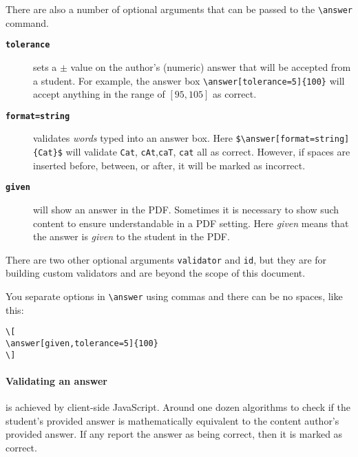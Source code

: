 \documentclass{ximera}
\begin{document}
There are also a number of optional arguments that can be passed
to the \verb|\answer| command.
\begin{description}
  \item[\tt\bfseries tolerance] sets a $\pm$ value on the
    author's (numeric) answer that will be accepted from a student. For
    example,
    the answer box \verb|\answer[tolerance=5]{100}| will accept anything in
    the range of $[95,105]$ as correct.
  \item[\tt\bfseries format=string] validates \textit{words} typed into an
    answer box. Here \verb|$\answer[format=string]{Cat}$| will validate
    \verb!Cat!,
    \verb!cAt!,\verb!caT!, \verb!cat! all as
    correct. However, if spaces are inserted before, between, or after, it will
    be marked as incorrect.
  \item[\tt\bfseries given] will show an answer in the PDF. Sometimes it is
    necessary to
    show such content to ensure
    understandable in a PDF setting. Here \textit{given} means
    that the answer is \textit{given} to the student in the PDF.
\end{description}
There are two other optional arguments \verb!validator! and \verb!id!, but they
are for building custom validators and are beyond the scope of this document.

\begin{warning}
  You separate options in \verb!\answer! using commas and there can be no
  spaces, like this:
  \begin{verbatim}
\[
\answer[given,tolerance=5]{100}
\]
\end{verbatim}
\end{warning}

\paragraph{Validating an answer} is achieved by client-side JavaScript. Around
one dozen algorithms to check if the student's provided
answer is mathematically equivalent to the content author's provided answer. If
any report the answer as being correct, then it is marked as correct.
\end{document}
